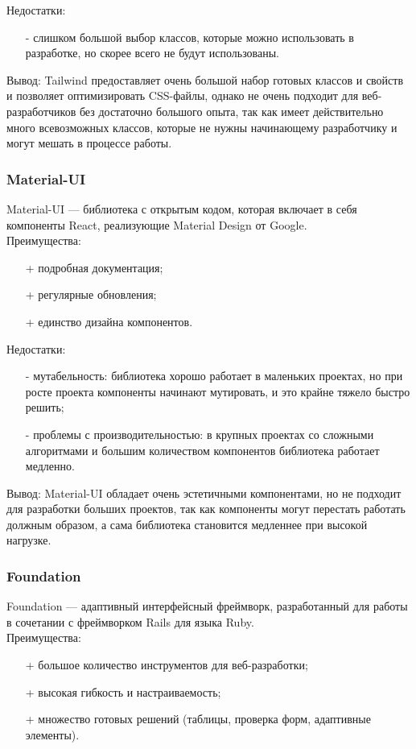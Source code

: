 \documentclass[a4paper,12pt]{article}
\begin{document}
Недостатки:
\begin{itemize}
	\item[-] слишком большой выбор классов, которые можно использовать в разработке, но скорее всего не будут использованы.\\
\end{itemize}

Вывод: Tailwind предоставляет очень большой набор готовых классов и свойств и позволяет оптимизировать CSS-файлы, однако не очень подходит для веб-разработчиков без достаточно большого опыта, так как имеет действительно много всевозможных классов, которые не нужны начинающему разработчику и могут мешать в процессе работы.

\subsubsection{Material-UI}
Material-UI — библиотека с открытым кодом, которая включает в себя компоненты React, реализующие Material Design от Google.\\
Преимущества:
\begin{itemize}
	\item[+] подробная документация;
	\item[+] регулярные обновления;
	\item[+] единство дизайна компонентов.
\end{itemize}

Недостатки:
\begin{itemize}
	\item[-] мутабельность: библиотека хорошо работает в маленьких проектах, но при росте проекта компоненты начинают мутировать, и это крайне тяжело быстро решить;
	\item[-] проблемы с производительностью: в крупных проектах со сложными алгоритмами и большим количеством компонентов библиотека работает медленно.\\
\end{itemize}

Вывод: Material-UI обладает очень эстетичными компонентами, но не подходит для разработки больших проектов, так как компоненты могут перестать работать должным образом, а сама библиотека становится медленнее при высокой нагрузке.\\

\subsubsection{Foundation}
Foundation — адаптивный интерфейсный фреймворк, разработанный для работы в сочетании с фреймворком Rails для языка Ruby.\\
Преимущества:
\begin{itemize}
	\item[+] большое количество инструментов для веб-разработки;
	\item[+] высокая гибкость и настраиваемость;
	\item[+] множество готовых решений (таблицы, проверка форм, адаптивные элементы).
\end{itemize}
\end{document}
